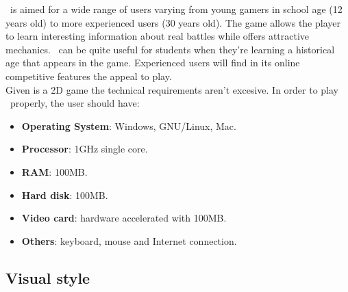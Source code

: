 \game\ is aimed for a wide range of users varying from young gamers
in school age (12 years old) to more experienced users (30 years old).
The game allows the player to learn interesting information about real
battles while offers attractive mechanics. \game\ can be quite useful for
students when they're learning a historical age that appears in the game.
Experienced users will find in its online competitive features the appeal
to play.\\

Given is a 2D game the technical requirements aren't excesive. In order
to play \game\ properly, the user should have:

\begin{itemize}
    \item \textbf{Operating System}: Windows, GNU/Linux, Mac.
    \item \textbf{Processor}: 1GHz single core.
    \item \textbf{RAM}: 100MB.
    \item \textbf{Hard disk}: 100MB.
    \item \textbf{Video card}: hardware accelerated with 100MB.
    \item \textbf{Others}: keyboard, mouse and Internet connection.
\end{itemize}

\subsection{Visual style}
